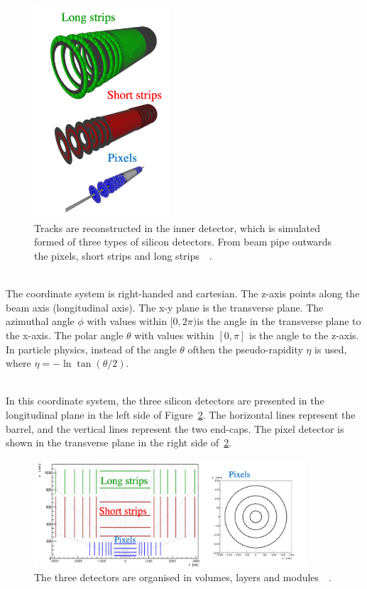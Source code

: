 \begin{figure}[htb]
\centering
\includegraphics[width=0.45\textwidth]{./plots/ThreeSiDetectors.png}
\caption{Tracks are reconstructed in the inner detector, which is simulated formed of three types of silicon detectors. From beam pipe outwards the pixels, short strips and long strips~\cite{TrackMLPPTBefore}~\cite{TrackMLPaperAccuracyPhase}.}
\label{fig:ThreeSiDetectors}
\end{figure}

\ \\The coordinate system is right-handed and cartesian. The z-axis points along the beam axis (longitudinal axis). The x-y plane is the transverse plane. The azimuthal angle $\phi$ with values within $[0, 2\pi) $is the angle in the transverse plane to the x-axis. The polar angle $\theta$ with values within $[0, \pi]$ is the angle to the z-axis. In particle physics, instead of the angle $\theta$ ofthen the pseudo-rapidity $\eta$ is used, where $\eta = -\ln \tan (\theta/2)$. 

\ \\In this coordinate system, the three silicon detectors are presented in the longitudinal plane in the left side of Figure~\ref{fig:DetectorGeometry}. The horizontal lines represent the barrel, and the vertical lines represent the two end-caps. The pixel detector is shown in the transverse plane in the right side of~\ref{fig:DetectorGeometry}. 

\begin{figure}[hbt]
\centering
\includegraphics[width=0.9\textwidth]{./plots/DetectorGeometry.png}
\caption{The three detectors are organised in volumes, layers and modules~\cite{TrackMLPPTBefore}~\cite{TrackMLPaperAccuracyPhase}.}
\label{fig:DetectorGeometry}
\end{figure}


